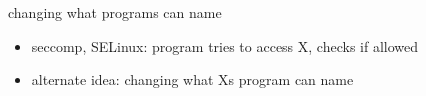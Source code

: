 \begin{frame}{changing what programs can name}
    \begin{itemize}
    \item seccomp, SELinux: program tries to access X, checks if allowed
    \vspace{.5cm}
    \item alternate idea: changing what Xs program can name
    \end{itemize}
\end{frame}
